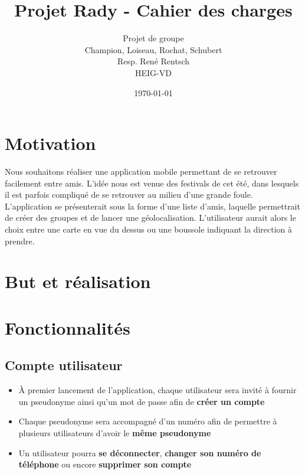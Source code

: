 \documentclass[french]{article}
\begin{document}
	
	\title{Projet Rady - Cahier des charges}
	\author{Projet de groupe\\
		Champion, Loiseau, Rochat, Schubert\\
		Resp. René Rentsch\\
		HEIG-VD}
	\date{\today}
	\maketitle
	
	\justify
	
	\section{Motivation}
		 Nous souhaitons réaliser une application mobile permettant de se retrouver facilement entre amis. L’idée nous est venue des festivals de cet été, dans lesquels il est parfois compliqué de se retrouver au milieu d’une grande foule. L’application se présenterait sous la forme d’une liste d’amis, laquelle permettrait de créer des groupes et de lancer une géolocalisation. L’utilisateur aurait alors le choix entre une carte en vue du dessus ou une boussole indiquant la direction à
		 prendre.
	
	\section{But et réalisation}
	
	\section{Fonctionnalités}
	
		\subsection{Compte utilisateur}
			\begin{itemize}
				\item À premier lancement de l'application, chaque utilisateur sera invité à fournir un pseudonyme ainsi qu'un mot de passe afin de \textbf{créer un compte} 
				\item Chaque pseudonyme sera accompagné d'un numéro afin de permettre à plusieurs utilisateurs d'avoir le \textbf{même pseudonyme}
				\item Un utilisateur pourra \textbf{se déconnecter}, \textbf{changer son numéro de téléphone} ou encore \textbf{supprimer son compte}
			\end{itemize}
	
\end{document}
